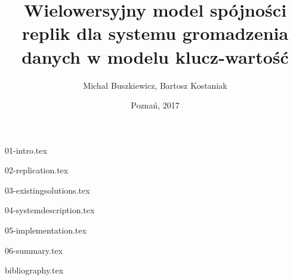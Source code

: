\documentclass[11pt,a4paper,polish,thesis]{dcsbook}
\begin{document}
\author{Michał Buszkiewicz, Bartosz Kostaniak}
\title{Wielowersyjny model spójności replik dla systemu gromadzenia danych w modelu klucz-wartość}
\date{Poznań, 2017}
\maketitle
\frontmatter
\tableofcontents{}
\mainmatter

{01-intro.tex}

{02-replication.tex}

{03-existingsolutions.tex}

{04-systemdescription.tex}

{05-implementation.tex}


{06-summary.tex}

\backmatter
{bibliography.tex}
\end{document}
